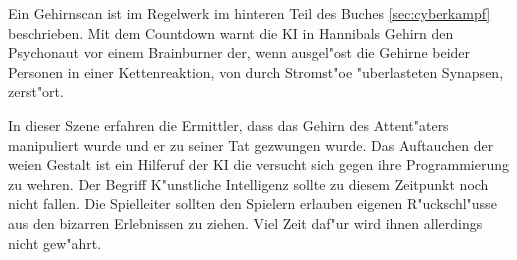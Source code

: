 \begin{remarks}
	Ein Gehirnscan ist im Regelwerk im hinteren Teil des Buches \cref{sec:cyberkampf} beschrieben. Mit dem Countdown warnt die KI in Hannibals Gehirn den Psychonaut vor einem Brainburner der, wenn ausgel"ost die Gehirne beider Personen in einer Kettenreaktion, von durch Stromst"o\3e "uberlasteten Synapsen, zerst"ort.

	In dieser Szene erfahren die Ermittler, dass das Gehirn des Attent"aters manipuliert wurde und er zu seiner Tat gezwungen wurde. Das Auftauchen der wei\3en Gestalt ist ein Hilferuf der KI die versucht sich gegen ihre Programmierung zu wehren. Der Begriff K"unstliche Intelligenz sollte zu diesem Zeitpunkt noch nicht fallen. Die Spielleiter sollten den Spielern erlauben eigenen R"uckschl"usse aus den bizarren Erlebnissen zu ziehen. Viel Zeit daf"ur wird ihnen allerdings nicht gew"ahrt.
\end{remarks}
